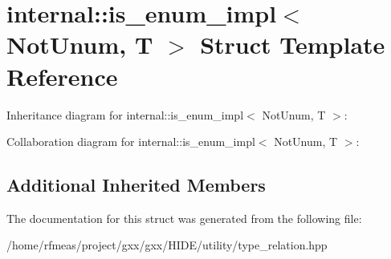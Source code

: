 \hypertarget{structinternal_1_1is__enum__impl}{}\section{internal\+:\+:is\+\_\+enum\+\_\+impl$<$ Not\+Unum, T $>$ Struct Template Reference}
\label{structinternal_1_1is__enum__impl}


Inheritance diagram for internal\+:\+:is\+\_\+enum\+\_\+impl$<$ Not\+Unum, T $>$\+:


Collaboration diagram for internal\+:\+:is\+\_\+enum\+\_\+impl$<$ Not\+Unum, T $>$\+:
\subsection*{Additional Inherited Members}


The documentation for this struct was generated from the following file\+:\begin{DoxyCompactItemize}
\item 
/home/rfmeas/project/gxx/gxx/\+H\+I\+D\+E/utility/type\+\_\+relation.\+hpp\end{DoxyCompactItemize}
